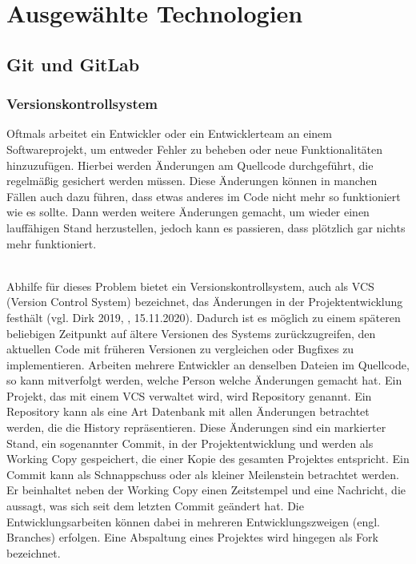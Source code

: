 \chapter{Ausgewählte Technologien}

\section{Git und GitLab}

\subsection{Versionskontrollsystem}
Oftmals arbeitet ein Entwickler oder ein Entwicklerteam an einem Softwareprojekt, um entweder Fehler zu beheben oder neue Funktionalitäten hinzuzufügen. Hierbei werden Änderungen am Quellcode durchgeführt, die regelmäßig gesichert werden müssen. Diese Änderungen können in manchen Fällen auch dazu führen, dass etwas anderes im Code nicht mehr so funktioniert wie es sollte. Dann werden weitere Änderungen gemacht, um wieder einen lauffähigen Stand herzustellen, jedoch kann es passieren, dass plötzlich gar nichts mehr funktioniert.

\mbox{}\\Abhilfe für dieses Problem bietet ein Versionskontrollsystem, auch als VCS (Version Control System) bezeichnet, das Änderungen in der Projektentwicklung festhält (vgl. Dirk 2019, \cite{vcs_2019}, 15.11.2020). Dadurch ist es möglich zu einem späteren beliebigen Zeitpunkt auf ältere Versionen des Systems zurückzugreifen, den aktuellen Code mit früheren Versionen zu vergleichen oder Bugfixes zu implementieren. Arbeiten mehrere Entwickler an denselben Dateien im Quellcode, so kann mitverfolgt werden, welche Person welche Änderungen gemacht hat. Ein Projekt, das mit einem VCS verwaltet wird, wird Repository genannt. Ein Repository kann als eine Art Datenbank mit allen Änderungen betrachtet werden, die die History repräsentieren. Diese Änderungen sind ein markierter Stand, ein sogenannter Commit, in der Projektentwicklung und werden als Working Copy gespeichert, die einer Kopie des gesamten Projektes entspricht. Ein Commit kann als Schnappschuss oder als kleiner Meilenstein betrachtet werden. Er beinhaltet neben der Working Copy einen Zeitstempel und eine Nachricht, die aussagt, was sich seit dem letzten Commit geändert hat. Die Entwicklungsarbeiten können dabei in mehreren Entwicklungszweigen (engl. Branches) erfolgen. Eine Abspaltung eines Projektes wird hingegen als Fork bezeichnet.

